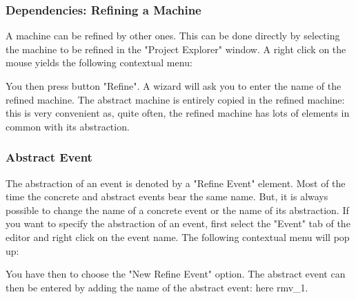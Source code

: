 \subsubsection{Dependencies: Refining a Machine}

A machine can be refined by other ones. This can be done directly by selecting the machine to be refined in the "Project Explorer" window. A right click on the mouse yields the following contextual menu:


You then press button "Refine". A wizard will ask you to enter the name of the refined machine. The abstract machine is entirely copied in the refined machine: this is very convenient as, quite often, the refined machine has lots of elements in common with its abstraction. 

\subsubsection{Abstract Event}

The abstraction of an event is denoted by a "Refine Event" element. Most of the time the concrete and abstract events bear the same name. But, it is always possible to change the name of a concrete event or the name of its abstraction. If you want to specify the abstraction of an event, first select the "Event" tab of the editor and right click on the event name. The following contextual menu will pop up:


You have then to choose the "New Refine Event" option. The abstract event can then be entered by adding the name of the abstract event: here rmv\_1.


